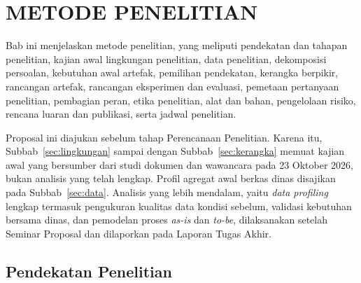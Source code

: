 \chapter{METODE PENELITIAN}
\label{chap:metode}

Bab ini menjelaskan metode penelitian, yang meliputi pendekatan dan tahapan penelitian, kajian awal lingkungan penelitian, data penelitian, dekomposisi persoalan, kebutuhan awal artefak, pemilihan pendekatan, kerangka berpikir, rancangan artefak, rancangan eksperimen dan evaluasi, pemetaan pertanyaan penelitian, pembagian peran, etika penelitian, alat dan bahan, pengelolaan risiko, rencana luaran dan publikasi, serta jadwal penelitian.

Proposal ini diajukan sebelum tahap Perencanaan Penelitian. Karena itu, Subbab~\ref{sec:lingkungan} sampai dengan Subbab~\ref{sec:kerangka} memuat kajian awal yang bersumber dari studi dokumen dan wawancara pada 23 Oktober 2026, bukan analisis yang telah lengkap. Profil agregat awal berkas dinas disajikan pada Subbab~\ref{sec:data}. Analisis yang lebih mendalam, yaitu \textit{data profiling} lengkap termasuk pengukuran kualitas data kondisi sebelum, validasi kebutuhan bersama dinas, dan pemodelan proses \textit{as-is} dan \textit{to-be}, dilaksanakan setelah Seminar Proposal dan dilaporkan pada Laporan Tugas Akhir.

\section{Pendekatan Penelitian}
\label{sec:metode}

